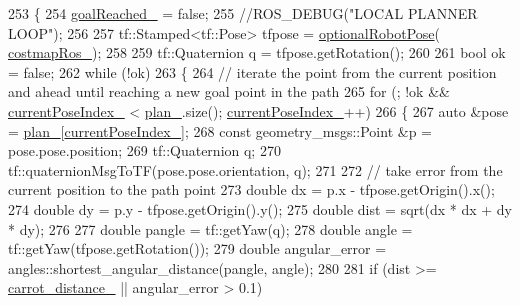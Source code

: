 \begin{DoxyCode}
253 \{
254     \hyperlink{classmove__base__z__client_1_1forward__local__planner_1_1ForwardLocalPlanner_a2c86f8381cc3b8677f95f32ae6939023}{goalReached\_} = \textcolor{keyword}{false};
255     \textcolor{comment}{//ROS\_DEBUG("LOCAL PLANNER LOOP");}
256 
257     tf::Stamped<tf::Pose> tfpose = \hyperlink{namespacemove__base__z__client_1_1forward__local__planner_a683a39a154ed5aa179fdb1afb7bfe2e4}{optionalRobotPose}(
      \hyperlink{classmove__base__z__client_1_1forward__local__planner_1_1ForwardLocalPlanner_a00139db9509e49ff456276a86785d234}{costmapRos\_});
258 
259     tf::Quaternion q = tfpose.getRotation();
260 
261     \textcolor{keywordtype}{bool} ok = \textcolor{keyword}{false};
262     \textcolor{keywordflow}{while} (!ok)
263     \{
264         \textcolor{comment}{// iterate the point from the current position and ahead until reaching a new goal point in the
       path}
265         \textcolor{keywordflow}{for} (; !ok && \hyperlink{classmove__base__z__client_1_1forward__local__planner_1_1ForwardLocalPlanner_a7033550f29cdac00cc997a3ce352dfd1}{currentPoseIndex\_} < \hyperlink{classmove__base__z__client_1_1forward__local__planner_1_1ForwardLocalPlanner_a1c6191c999481e31fabd41f7a04041fe}{plan\_}.size(); 
      \hyperlink{classmove__base__z__client_1_1forward__local__planner_1_1ForwardLocalPlanner_a7033550f29cdac00cc997a3ce352dfd1}{currentPoseIndex\_}++)
266         \{
267             \textcolor{keyword}{auto} &pose = \hyperlink{classmove__base__z__client_1_1forward__local__planner_1_1ForwardLocalPlanner_a1c6191c999481e31fabd41f7a04041fe}{plan\_}[\hyperlink{classmove__base__z__client_1_1forward__local__planner_1_1ForwardLocalPlanner_a7033550f29cdac00cc997a3ce352dfd1}{currentPoseIndex\_}];
268             \textcolor{keyword}{const} geometry\_msgs::Point &p = pose.pose.position;
269             tf::Quaternion q;
270             tf::quaternionMsgToTF(pose.pose.orientation, q);
271 
272             \textcolor{comment}{// take error from the current position to the path point}
273             \textcolor{keywordtype}{double} dx = p.x - tfpose.getOrigin().x();
274             \textcolor{keywordtype}{double} dy = p.y - tfpose.getOrigin().y();
275             \textcolor{keywordtype}{double} dist = sqrt(dx * dx + dy * dy);
276 
277             \textcolor{keywordtype}{double} pangle = tf::getYaw(q);
278             \textcolor{keywordtype}{double} angle = tf::getYaw(tfpose.getRotation());
279             \textcolor{keywordtype}{double} angular\_error = angles::shortest\_angular\_distance(pangle, angle);
280 
281             \textcolor{keywordflow}{if} (dist >= \hyperlink{classmove__base__z__client_1_1forward__local__planner_1_1ForwardLocalPlanner_a11c96a46695fedcc1508944b85079cb5}{carrot\_distance\_} || angular\_error > 0.1)

\end{DoxyCode}
